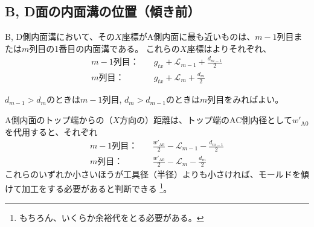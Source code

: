 \subsection{B, D面の内面溝の位置（傾き前）}
B, D側内面溝において、その$X$座標がA側内面に最も近いものは、$m-1$列目または$m$列目の1番目の内面溝である。
これらの$X$座標はよりそれぞれ、
\begin{align*}
  m-1\text{列目：}&\quad
  g_{tx}+\mathcal L_{m-1}+\frac{d_{m-1}}2\\
  m\text{列目：}&\quad
  g_{tx}+\mathcal L_m+\frac{d_m}2
\end{align*}
\begin{hosoku}
$d_{m-1} > d_m$のときは$m-1$列目, $d_m > d_{m-1}$のときは$m$列目をみればよい。
\end{hosoku}
A側内面のトップ端からの（$X$方向の）距離は、トップ端のAC側内径として$w'_{\mathrm A0}$を代用すると、それぞれ
\begin{align*}
  m-1\text{列目：}&\quad
  \frac{w'_{\mathrm A0}}2-\mathcal L_{m-1}-\frac{d_{m-1}}2\\
  m\text{列目：}&\quad
  \frac{w'_{\mathrm A0}}2-\mathcal L_m-\frac{d_m}2
\end{align*}
これらのいずれか小さいほうが工具径（半径）よりも小さければ、モールドを傾けて加工をする必要があると判断できる
\footnote{もちろん、いくらか余裕代をとる必要がある。}。
